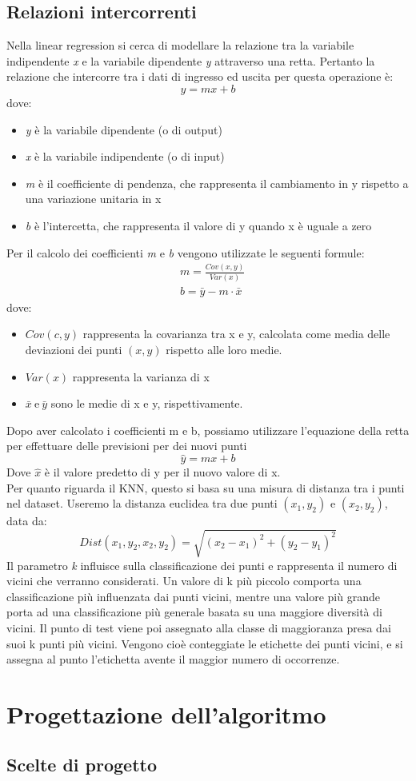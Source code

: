 \documentclass[11pt]{article}
\theoremstyle{definition}
\begin{document}
\subsection{Relazioni intercorrenti}
Nella linear regression si cerca di modellare la relazione tra la variabile indipendente \textit{x} e la variabile dipendente \textit{y} attraverso una retta. Pertanto la relazione che intercorre tra i dati di ingresso ed uscita per questa operazione è:
$$
y=mx+b
$$
dove:
\begin{itemize}
\item \textit{y} è la variabile dipendente (o di output)
\item \textit{x} è la variabile indipendente (o di input)
\item \textit{m} è il coefficiente di pendenza, che rappresenta il cambiamento in y rispetto a una variazione unitaria in x
\item \textit{b} è l'intercetta, che rappresenta il valore di y quando x è uguale a zero
\end{itemize}
Per il calcolo dei coefficienti \textit{m} e \textit{b} vengono utilizzate le seguenti formule:
\begin{align*}
&m = \frac{Cov(x,y)}{Var(x)}\\
&b=\bar{y}-m\cdot \bar{x}
\end{align*}
dove:
\begin{itemize}
\item $Cov(c,y)$ rappresenta la covarianza tra x e y, calcolata come media delle deviazioni dei punti $(x,y)$ rispetto alle loro medie.
\item $Var(x)$ rappresenta la varianza di x
\item $\bar{x} \ \text{e} \ \bar{y}$ sono le medie di x e y, rispettivamente.
\end{itemize}
Dopo aver calcolato i coefficienti m e b, possiamo utilizzare l'equazione della retta per effettuare delle previsioni per dei nuovi punti
$$
\hat{y} = mx+b
$$
Dove $\hat{x}$ è il valore predetto di y per il nuovo valore di x.\\
\newline
Per quanto riguarda il KNN, questo si basa su una misura di distanza tra i punti nel dataset. Useremo la distanza euclidea tra due punti $(x_1,y_2)$ e $(x_2,y_2)$, data da:
$$
Dist(x_1,y_2,x_2,y_2)=\sqrt{(x_2-x_1)^2 + (y_2-y_1)^2}
$$ 
Il parametro \textit{k} influisce sulla classificazione dei punti e rappresenta il numero di vicini che verranno considerati. Un valore di k più piccolo comporta una classificazione più influenzata dai punti vicini, mentre una valore più grande porta ad una classificazione più generale basata su una maggiore diversità di vicini. Il punto di test viene poi assegnato alla classe di maggioranza presa dai suoi k punti più vicini. Vengono cioè conteggiate le etichette dei punti vicini, e si assegna al punto l'etichetta avente il maggior numero di occorrenze.

\new 

\section{Progettazione dell'algoritmo}

\subsection{Scelte di progetto}
\end{document}
